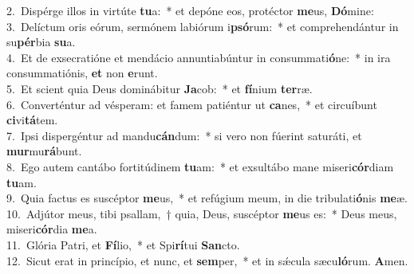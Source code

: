 {2.~}Dispérge illos in virtúte \textbf{tu}a:~* et depóne eos, protéctor \textbf{me}us, \textbf{Dó}mine:\\
{3.~}Delíctum oris eórum, sermónem labiórum i\textbf{psó}rum:~* et comprehendántur in su\textbf{pér}bia \textbf{su}a.\\
{4.~}Et de exsecratióne et mendácio annuntiabúntur in consummati\textbf{ó}ne:~* in ira consummatiónis, \textbf{et} non \textbf{e}runt.\\
{5.~}Et scient quia Deus dominábitur \textbf{Ja}cob:~* et \textbf{fí}nium \textbf{ter}ræ.\\
{6.~}Converténtur ad vésperam: et famem patiéntur ut \textbf{ca}nes,~* et circuíbunt \textbf{ci}vi\textbf{tá}tem.\\
{7.~}Ipsi dispergéntur ad mandu\textbf{cán}dum:~* si vero non fúerint saturáti, et \textbf{mur}mu\textbf{rá}bunt.\\
{8.~}Ego autem cantábo fortitúdinem \textbf{tu}am:~* et exsultábo mane miseri\textbf{cór}diam \textbf{tu}am.\\
{9.~}Quia factus es suscéptor \textbf{me}us,~* et refúgium meum, in die tribulati\textbf{ó}nis \textbf{me}æ.\\
{10.~}Adjútor meus, tibi psallam,~† quia, Deus, suscéptor \textbf{me}us es:~* Deus meus, miseri\textbf{cór}dia \textbf{me}a.\\
{11.~}Glória Patri, et \textbf{Fí}lio,~* et Spi\textbf{rí}tui \textbf{San}cto.\\
{12.~}Sicut erat in princípio, et nunc, et \textbf{sem}per,~* et in sǽcula sæcu\textbf{ló}rum. \textbf{A}men.\\
